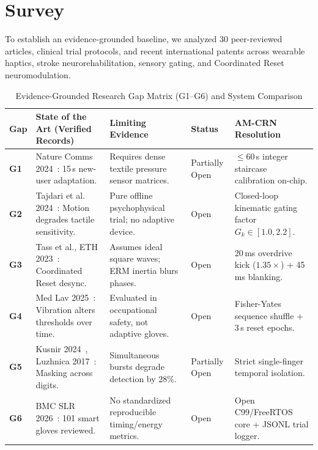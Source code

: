 \documentclass[10pt,twocolumn]{article}
\begin{document}
\section{Survey}
To establish an evidence-grounded baseline, we analyzed 30 peer-reviewed articles, clinical trial protocols, and recent international patents across wearable haptics, stroke neurorehabilitation, sensory gating, and Coordinated Reset neuromodulation.

\begin{table}[t]
\centering
\caption{Evidence-Grounded Research Gap Matrix (G1--G6) and System Comparison}
\label{tab:gaps}
\small
\begin{tabularx}{\textwidth}{l p{4.2cm} p{4.2cm} l X}
\toprule
\textbf{Gap} & \textbf{State of the Art (Verified Records)} & \textbf{Limiting Evidence} & \textbf{Status} & \textbf{AM-CRN Resolution} \\
\midrule
\textbf{G1} & Nature Comms 2024~\cite{nature_comms_2024_embroidered_glove}: 15\,s new-user adaptation. & Requires dense textile pressure sensor matrices. & Partially Open & $\le$60\,s integer staircase calibration on-chip. \\
\textbf{G2} & Tajdari et al. 2024~\cite{human_factors_2024_motion_sensitivity}: Motion degrades tactile sensitivity. & Pure offline psychophysical trial; no adaptive device. & Open & Closed-loop kinematic gating factor $G_k \in [1.0, 2.2]$. \\
\textbf{G3} & Tass et al., ETH 2023~\cite{jneurophys_2023_somatosensory_finger_rep}: Coordinated Reset desync. & Assumes ideal square waves; ERM inertia blurs phases. & Open & 20\,ms overdrive kick ($1.35\times$) + 45\,ms blanking. \\
\textbf{G4} & Med Lav 2025~\cite{med_lav_2025_neurosensory_vibration}: Vibration alters thresholds over time. & Evaluated in occupational safety, not adaptive gloves. & Open & Fisher-Yates sequence shuffle + 3\,s reset epochs. \\
\textbf{G5} & Kusnir 2024~\cite{app_2024_contralateral_interference}, Luzhnica 2017~\cite{acm_2017_sensitivity_prioritisation}: Masking across digits. & Simultaneous bursts degrade detection by 28\%. & Partially Open & Strict single-finger temporal isolation. \\
\textbf{G6} & BMC SLR 2026~\cite{springer_2026_smart_glove_slr}: 101 smart gloves reviewed. & No standardized reproducible timing/energy metrics. & Open & Open C99/FreeRTOS core + JSONL trial logger. \\
\bottomrule
\end{tabularx}
\end{table}
\end{document}

